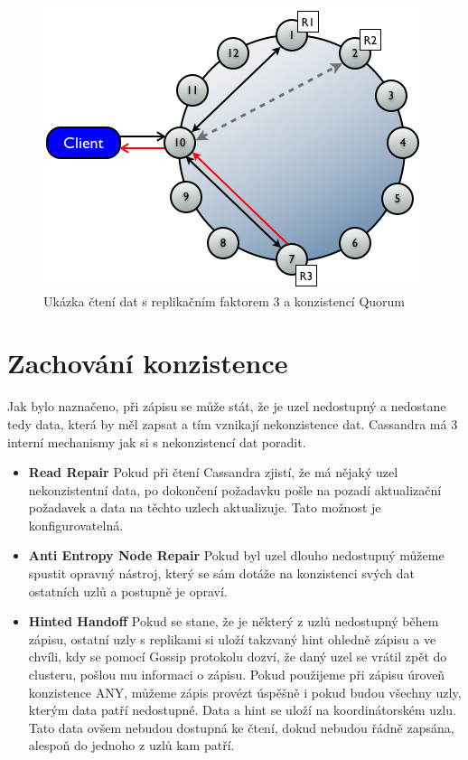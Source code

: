 \begin{figure}[h]
\centering
\includegraphics[scale=0.55]{images/read}
\caption{Ukázka čtení dat s replikačním faktorem 3 a konzistencí Quorum}
\label{fig:vnodes}
\end{figure}


\section{Zachování konzistence}
Jak bylo naznačeno, při zápisu se může stát, že je uzel nedostupný a nedostane tedy data, která by měl zapsat a tím vznikají nekonzistence dat. Cassandra má 3 interní mechanismy jak si s nekonzistencí dat poradit. 

\begin{itemize}
\item \textbf{Read Repair} Pokud při čtení Cassandra zjistí, že má nějaký uzel nekonzistentní data, po dokončení požadavku pošle na pozadí aktualizační požadavek a data na těchto uzlech aktualizuje. Tato možnost je konfigurovatelná.
\item \textbf{Anti Entropy Node Repair} Pokud byl uzel dlouho nedostupný můžeme spustit opravný nástroj, který se sám dotáže na konzistenci svých dat ostatních uzlů a postupně je opraví. 
\item \textbf{Hinted Handoff} Pokud se stane, že je některý z uzlů nedostupný během zápisu, ostatní uzly s replikami si uloží takzvaný hint ohledně zápisu a ve chvíli, kdy se pomocí Gossip protokolu dozví, že daný uzel se vrátil zpět do clusteru, pošlou mu informaci o zápisu. Pokud použijeme při zápisu úroveň konzistence ANY, můžeme zápis provézt úspěšně i pokud budou všechny uzly, kterým data patří nedostupné. Data a hint se uloží na koordinátorském uzlu. Tato data ovšem nebudou dostupná ke čtení, dokud nebudou řádně zapsána, alespoň do jednoho z uzlů kam patří.
\end{itemize}

